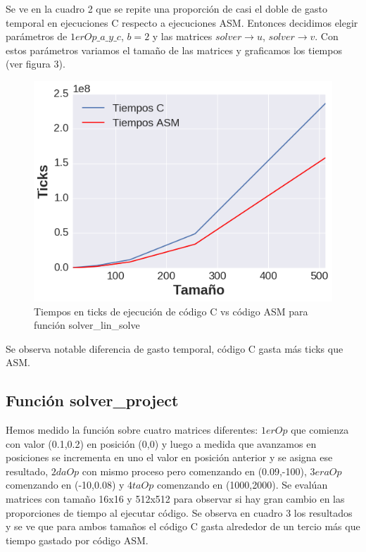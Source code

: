 \par Se ve en la cuadro 2 que se repite una proporción de casi el doble de gasto temporal en ejecuciones C respecto a ejecuciones ASM. Entonces decidimos elegir parámetros de $1erOp\_a\_y\_c$, $b = 2$ y las matrices $solver\rightarrow u$, $solver\rightarrow v$.
 Con estos parámetros variamos el tamaño de las matrices y graficamos los tiempos (ver figura 3).
\begin{figure}[h]

\centering
\includegraphics[scale=0.6] {solver_lin_solve}
  
 \caption{Tiempos en ticks de ejecución de código C vs código ASM para función solver\_lin\_solve}
\end{figure}
Se observa notable diferencia de gasto temporal, código C gasta más ticks que ASM.

\subsection{Función solver\_project}
\par Hemos medido la función sobre cuatro matrices diferentes: $1erOp$ que comienza con valor (0.1,0.2) en posición (0,0) y luego a medida que avanzamos en posiciones se incrementa en uno el valor en posición anterior y se asigna ese resultado, $2daOp$ con mismo proceso pero comenzando en (0.09,-100), $3eraOp$ comenzando en (-10,0.08) y $4taOp$ comenzando en (1000,2000). Se evalúan matrices con tamaño 16x16 y 512x512 para observar si hay gran cambio en las proporciones de tiempo al ejecutar código. Se observa en cuadro 3 los resultados y se ve que 
para ambos tamaños el código C gasta alrededor de un tercio más que tiempo gastado por código ASM.\newline
 

